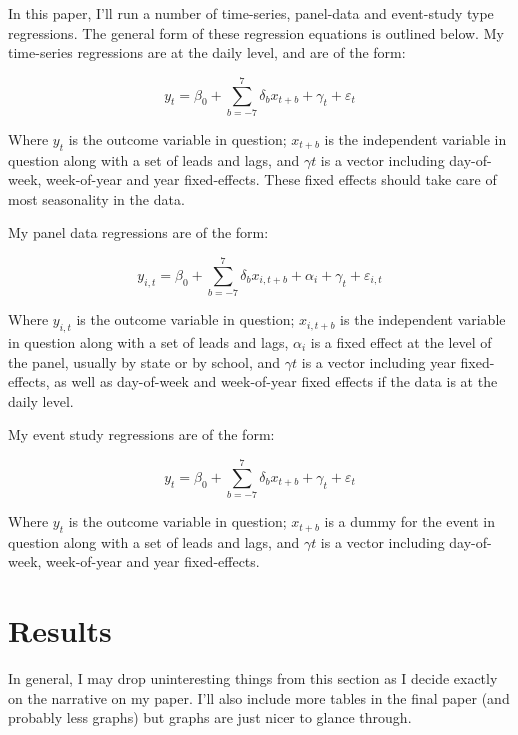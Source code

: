 \documentclass[AER,draftmode]{AEA}
\begin{document}
In this paper, I'll run a number of time-series, panel-data and event-study type regressions. The general form of these regression equations is outlined below. My time-series regressions are at the daily level, and are of the form: 

$$ 
y_{t} = \beta_{0} + \sum_{b=-7}^{7} \delta_{b} x_{t+b} + \gamma_{t} + \varepsilon_{t}
$$

Where $y_{t}$ is the outcome variable in question; $x_{t+b}$ is the independent variable in question along with a set of leads and lags, and $\gamma{t}$ is a vector including day-of-week, week-of-year and year fixed-effects. These fixed effects should take care of most seasonality in the data. 

My panel data regressions are of the form:

$$ 
y_{i,t} = \beta_{0} + \sum_{b=-7}^{7} \delta_{b} x_{i,t+b} + \alpha_{i} + \gamma_{t} + \varepsilon_{i,t}
$$

Where $y_{i,t}$ is the outcome variable in question; $x_{i,t+b}$ is the independent variable in question along with a set of leads and lags, $\alpha_{i}$ is a fixed effect at the level of the panel, usually by state or by school, and $\gamma{t}$ is a vector including year fixed-effects, as well as day-of-week and week-of-year fixed effects if the data is at the daily level.

My event study regressions are of the form:

$$ 
y_{t} = \beta_{0} + \sum_{b=-7}^{7} \delta_{b} x_{t+b} + \gamma_{t} + \varepsilon_{t}
$$

Where $y_{t}$ is the outcome variable in question; $x_{t+b}$ is a dummy for the event in question along with a set of leads and lags, and $\gamma{t}$ is a vector including day-of-week, week-of-year and year fixed-effects.

\section{Results}


In general, I may drop uninteresting things from this section as I decide exactly on the narrative on my paper. I'll also include more tables in the final paper (and probably less graphs) but graphs are just nicer to glance through.
\end{document}
